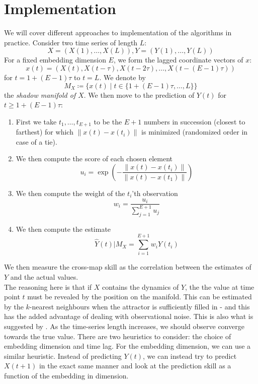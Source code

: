 \documentclass[11pt, a4paper]{memoir}
\theoremstyle{break}
\theoremstyle{break}
\theoremstyle{nonumberplain}
\newcommand{\norm}[1]{\left\lVert#1\right\rVert}
\begin{document}
\section{Implementation}
We will cover different approaches to implementation of the algorithms in practice. Consider two time series of length $L$:
$$X=(X(1),\ldots, X(L)), Y=(Y(1),\ldots, Y(L))$$
For a fixed embedding dimension $E$, we form the lagged coordinate vectors of $x$:
$$x(t)=(X(t), X(t-\tau),X(t-2\tau),\ldots, X(t-(E-1)\tau))$$
for $t=1+(E-1)\tau$ to $t=L$. We denote by
$$M_X\coloneqq\{x(t)\mid t\in \{1+(E-1)\tau,\ldots,L\}\}$$
the \emph{shadow manifold of $X$}. We then move to the prediction of $Y(t)$ for $t\geqslant 1+(E-1)\tau$:
\begin{enumerate}[label=\arabic*.]
	\item First we take $t_1,\ldots,t_{E+1}$ to be the $E+1$ numbers in succession (closest to farthest) for which $\norm{x(t)-x(t_{i})}$ is minimized (randomized order in case of a tie).
	\item We then compute the score of each chosen element
	$$u_i=\exp\left(-\frac{\norm{x(t)-x(t_i)}}{\norm{x(t)-x(t_1)}}\right)$$
	\item We then compute the weight of the $t_i$'th observation
	$$w_i=\frac{u_i}{\sum_{j=1}^{E+1} u_j}$$
	\item We then compute the estimate
	$$\hat{Y}(t)|M_X=\sum_{i=1}^{E+1} w_i Y(t_i)$$
\end{enumerate}
We then measure the cross-map skill as the correlation between the estimates of $Y$ and the actual values.\\[5pt]
The reasoning here is that if $X$ contains the dynamics of $Y$, the the value at time point $t$ must be revealed by the position on the manifold. This can be estimated by the $k$-nearest neighbours when the attractor is sufficiently filled in - and this has the added advantage of dealing with observational noise. This is also what is suggested by \cite{Casdagli}. As the time-series length increases, we should observe converge towards the true value. There are two heuristics to consider: the choice of embedding dimension and time lag. For the embedding dimension, we can use a similar heuristic. Instead of predicting $Y(t)$, we can instead try to predict $X(t+1)$ in the exact same manner and look at the prediction skill as a function of the embedding in dimension. 
\end{document}

